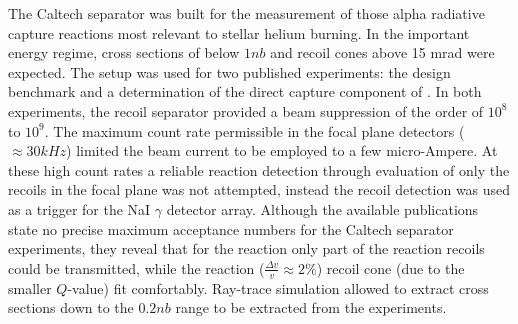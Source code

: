 The Caltech separator was built for the measurement of those alpha radiative capture reactions most relevant to stellar helium burning. In the important energy regime, cross sections of below $1 \unit{nb}$ and recoil cones above 15 mrad were expected. The setup was used for two published experiments: the design benchmark \reac{\alpha}{\gamma} \cite{krem88} and a determination of the direct capture component of \reac{\alpha}{\gamma} \cite{hahn87}. In both experiments, the recoil separator provided a beam suppression of the order of $10^8$ to $10^9$. The maximum count rate permissible in the focal plane detectors ($\approx 30 \unit{kHz}$) limited the beam current to be employed to a few micro-Ampere. At these high count rates a reliable reaction detection through evaluation of only the recoils in the focal plane was not attempted, instead the recoil detection was used as a trigger for the NaI $\gamma$ detector array. Although the available publications state no precise maximum acceptance numbers for the Caltech separator experiments, they reveal that for the \reac{\alpha}{\gamma} reaction only part of the reaction recoils could be transmitted, while the \reac{\alpha}{\gamma} reaction ($\frac{\Delta{}v}{v} \approx 2 \%$) recoil cone (due to the smaller $Q$-value) fit comfortably. Ray-trace simulation allowed to extract cross sections down to the $0.2 \unit{nb}$ range to be extracted from the experiments.\\ 
